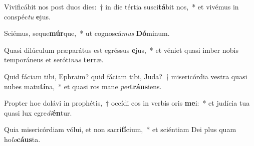 \item Vivificábit nos post duos dies:~† in die tértia susci\textbf{tá}bit nos,~* et vivémus in conspéc\textit{tu} \textbf{e}jus.
\item Sciémus, seque\textbf{múr}que,~* ut cognoscá\textit{mus} \textbf{Dó}minum.
\item Quasi dilúculum præparátus est egréssus \textbf{e}jus,~* et véniet quasi imber nobis temporáneus et seróti\textit{nus} \textbf{ter}ræ.
\item Quid fáciam tibi, Ephraim? quid fáciam tibi, Juda?~† misericórdia vestra quasi nubes matu\textbf{tí}na,~* et quasi ros mane \textit{per}\textbf{tráns}iens.
\item Propter hoc dolávi in prophétis,~† occídi eos in verbis oris \textbf{me}i:~* et judícia tua quasi lux egre\textit{di}\textbf{én}tur.
\item Quia misericórdiam vólui, et non sacri\textbf{fí}cium,~* et sciéntiam Dei plus quam ho\textit{lo}\textbf{cáus}ta.
